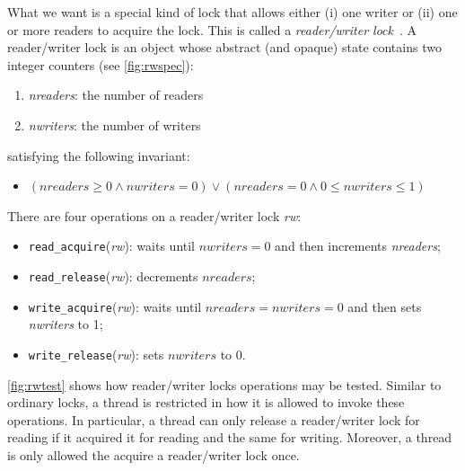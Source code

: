 \documentclass{report}
\begin{document}
What we want is a special kind of lock that allows either (i) one writer
or (ii) one or more readers to acquire the lock.  This is called
a \emph{reader/writer lock}~\cite{CHP71}.
%
A reader/writer lock is an object whose abstract (and opaque)
state contains two integer counters (see \autoref{fig:rwspec}):
\begin{enumerate}
\item \textit{nreaders}: the number of readers
\item \textit{nwriters}: the number of writers
\end{enumerate}
satisfying the following invariant:
\begin{itemize}
\item [] $(\mathit{nreaders} \ge 0 \land \mathit{nwriters} = 0) \lor
    (\mathit{nreaders} = 0 \land 0 \le \mathit{nwriters} \le 1)$
\end{itemize}

There are four operations on a reader/writer lock \textit{rw}:
\begin{itemize}
\item \texttt{read\_acquire}(\textit{rw}): waits until $\mathit{nwriters} = 0$
and then increments \textit{nreaders};
\item \texttt{read\_release}(\textit{rw}): decrements $\mathit{nreaders}$;
\item \texttt{write\_acquire}(\textit{rw}): waits until
$\mathit{nreaders} = \mathit{nwriters} = 0$
and then sets \textit{nwriters} to 1;
\item \texttt{write\_release}(\textit{rw}): sets $\mathit{nwriters}$ to 0.
\end{itemize}

\autoref{fig:rwtest} shows how reader/writer locks operations
may be tested.
Similar to ordinary locks, a thread is restricted in how it is allowed to
invoke these operations.
In particular, a thread can only release a reader/writer lock for reading
if it acquired it for reading and the same for writing.
Moreover, a thread is only allowed the acquire a reader/writer lock once.
\end{document}
